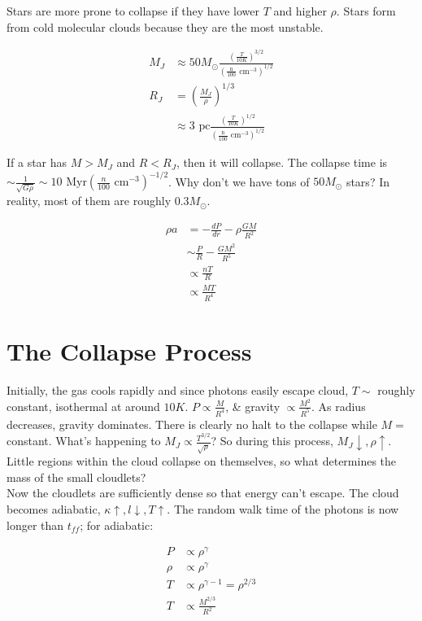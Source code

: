 \documentclass[10pt,letterpaper,final]{book}
\newcommand{\pt}{\propto}
\newcommand{\rp}{\right)}
\newcommand{\lp}{\left(}
\begin{document}
Stars are more prone to collapse if they have lower $T$ and higher $\rho$. Stars form from cold molecular clouds because they are the most unstable.

\begin{align}
M_J &\approx 50 M_\odot \frac{\lp \frac{T}{10K}\rp^{3/2}}{\lp \frac{\text{n}}{100} \text{ cm}^{-3} \rp^{1/2}}\\
R_J &= \lp \frac{M_J}{\rho} \rp^{1/3}\\
&\approx 3 \text{ pc} \frac{(\frac{T}{10K})^{1/2}}{(\frac{\text{n}}{100}\text{ cm}^{-3})^{1/2}}
\end{align}

If a star has $M>M_J$ and $R<R_J$, then it will collapse. The collapse time is $\sim \frac{1}{\sqrt{G\rho}} \sim 10\text{ Myr} \lp \frac{n}{100}\text{ cm}^{-3} \rp^{-1/2}$. Why don't we have tons of $50M_\odot$ stars? In reality, most of them are roughly $0.3M_\odot$. 

\begin{align}
\rho a &= -\frac{dP}{dr}- \rho \frac{GM}{R^2}\\
&\sim \frac{P}{R} - \frac{GM^2}{R^5}\\
&\pt \frac{nT}{R}\\
&\pt \frac{MT}{R^4}
\end{align}

\section{The Collapse Process}

Initially, the gas cools rapidly and since photons easily escape cloud, $T \sim$ roughly constant, isothermal at around $10K$. $P \pt \frac{M}{R^4}$, \& gravity $\pt \frac{M^2}{R^5}$. As radius decreases, gravity dominates. There is clearly no halt to the collapse while $M=$ constant. What's happening to $M_J \pt \frac{T^{3/2}}{\sqrt{\rho}}$? So during this process, $M_J \downarrow, \rho \uparrow$. Little regions within the cloud collapse on themselves, so what determines the mass of the small cloudlets? \\

\noindent Now the cloudlets are sufficiently dense so that energy can't escape. The cloud becomes adiabatic, $\kappa \uparrow, l \downarrow, T \uparrow$. The random walk time of the photons is now longer than $t_{ff}$; for adiabatic:

\begin{align}
P &\pt \rho^\gamma\\
\rho &\pt \rho^\gamma\\
T &\pt \rho^{\gamma-1} = \rho^{2/3}\\
T &\pt \frac{M^{2/3}}{R^2}
\end{align}
\end{document}
